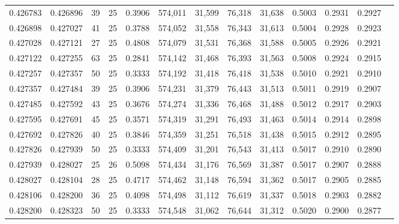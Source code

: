 \begin{tabular}{rrrrrrrrrrrrr}
0.426783 & 0.426896 &    39 &  25 &                                     0.3906 & 574,011 &  31,599 &  76,318 &  31,638 & 0.5003 & 0.2931 & 0.2927 \\
0.426898 & 0.427027 &    41 &  25 &                                     0.3788 & 574,052 &  31,558 &  76,343 &  31,613 & 0.5004 & 0.2928 & 0.2923 \\
0.427028 & 0.427121 &    27 &  25 &                                     0.4808 & 574,079 &  31,531 &  76,368 &  31,588 & 0.5005 & 0.2926 & 0.2921 \\
0.427122 & 0.427255 &    63 &  25 &                                     0.2841 & 574,142 &  31,468 &  76,393 &  31,563 & 0.5008 & 0.2924 & 0.2915 \\
0.427257 & 0.427357 &    50 &  25 &                                     0.3333 & 574,192 &  31,418 &  76,418 &  31,538 & 0.5010 & 0.2921 & 0.2910 \\
0.427357 & 0.427484 &    39 &  25 &                                     0.3906 & 574,231 &  31,379 &  76,443 &  31,513 & 0.5011 & 0.2919 & 0.2907 \\
0.427485 & 0.427592 &    43 &  25 &                                     0.3676 & 574,274 &  31,336 &  76,468 &  31,488 & 0.5012 & 0.2917 & 0.2903 \\
0.427595 & 0.427691 &    45 &  25 &                                     0.3571 & 574,319 &  31,291 &  76,493 &  31,463 & 0.5014 & 0.2914 & 0.2898 \\
0.427692 & 0.427826 &    40 &  25 &                                     0.3846 & 574,359 &  31,251 &  76,518 &  31,438 & 0.5015 & 0.2912 & 0.2895 \\
0.427826 & 0.427939 &    50 &  25 &                                     0.3333 & 574,409 &  31,201 &  76,543 &  31,413 & 0.5017 & 0.2910 & 0.2890 \\
0.427939 & 0.428027 &    25 &  26 &                                     0.5098 & 574,434 &  31,176 &  76,569 &  31,387 & 0.5017 & 0.2907 & 0.2888 \\
0.428027 & 0.428104 &    28 &  25 &                                     0.4717 & 574,462 &  31,148 &  76,594 &  31,362 & 0.5017 & 0.2905 & 0.2885 \\
0.428106 & 0.428200 &    36 &  25 &                                     0.4098 & 574,498 &  31,112 &  76,619 &  31,337 & 0.5018 & 0.2903 & 0.2882 \\
0.428200 & 0.428323 &    50 &  25 &                                     0.3333 & 574,548 &  31,062 &  76,644 &  31,312 & 0.5020 & 0.2900 & 0.2877 \\

\end{tabular}
